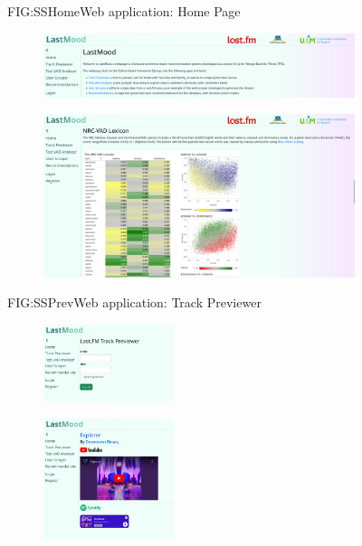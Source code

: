 \begin{figure}[Web application: Home Page]{FIG:SSHome}{Web application: Home Page}
    \begin{subfigure}[SBFIG:SSHome1]{Tools introduction}{\includegraphics[width=1\textwidth]{img/SSHome1.png}}
    \end{subfigure}
    \begin{subfigure}[SBFIG:SSHome2]{Interactive \acs{nrc}-\acs{vad} lexicon embed}{\includegraphics[width=1\textwidth]{img/SSHome2.png}}
    \end{subfigure}
\end{figure}

\begin{figure}[Web application: Track Previewer]{FIG:SSPrev}{Web application: Track Previewer}
    \begin{subfigure}[SBFIG:SSPrevForm]{Track previewer form}{\includegraphics[width=0.42\textwidth]{img/SSPrevForm.png}}
    \end{subfigure}
    \begin{subfigure}[SBFIG:SSPrev]{Example preview with artist \emph{Downtown Binary} and title \emph{Explorer}}{\includegraphics[width=0.42\textwidth]{img/SSPrev.png}}
    \end{subfigure}
\end{figure}

